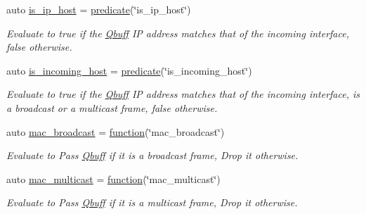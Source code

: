 \begin{DoxyCompactItemize}
auto \hyperlink{namespacepfq_1_1lang_1_1experimental_1_1anonymous__namespace_02experimental_8hpp_03_a323f07b8b6098198779c19fdf4c95837}{is\+\_\+ip\+\_\+host} = \hyperlink{namespacepfq_1_1lang_aca9adafc436b7f851621b979fa1aaf88}{predicate}(\char`\"{}is\+\_\+ip\+\_\+host\char`\"{})
\begin{DoxyCompactList}\small\item\em Evaluate to {\ttfamily true} if the \hyperlink{structpfq_1_1lang_1_1Qbuff}{Qbuff} IP address matches that of the incoming interface, {\ttfamily false} otherwise. \end{DoxyCompactList}\item 
auto \hyperlink{namespacepfq_1_1lang_1_1experimental_1_1anonymous__namespace_02experimental_8hpp_03_aa75d253ac688edcdbfc80160eba5678e}{is\+\_\+incoming\+\_\+host} = \hyperlink{namespacepfq_1_1lang_aca9adafc436b7f851621b979fa1aaf88}{predicate}(\char`\"{}is\+\_\+incoming\+\_\+host\char`\"{})
\begin{DoxyCompactList}\small\item\em Evaluate to {\ttfamily true} if the \hyperlink{structpfq_1_1lang_1_1Qbuff}{Qbuff} IP address matches that of the incoming interface, is a broadcast or a multicast frame, {\ttfamily false} otherwise. \end{DoxyCompactList}\item 
auto \hyperlink{namespacepfq_1_1lang_1_1experimental_1_1anonymous__namespace_02experimental_8hpp_03_aa889cbcf0c306d992508759fc5e677cd}{mac\+\_\+broadcast} = \hyperlink{namespacepfq_1_1lang_a1a4638059d700ae08d0ca63886ff2bb3}{function}(\char`\"{}mac\+\_\+broadcast\char`\"{})
\begin{DoxyCompactList}\small\item\em Evaluate to {\ttfamily Pass} \hyperlink{structpfq_1_1lang_1_1Qbuff}{Qbuff} if it is a broadcast frame, {\ttfamily Drop} it otherwise. \end{DoxyCompactList}\item 
auto \hyperlink{namespacepfq_1_1lang_1_1experimental_1_1anonymous__namespace_02experimental_8hpp_03_a0c39849f9e3e8677342842f88a8ee37c}{mac\+\_\+multicast} = \hyperlink{namespacepfq_1_1lang_a1a4638059d700ae08d0ca63886ff2bb3}{function}(\char`\"{}mac\+\_\+multicast\char`\"{})
\begin{DoxyCompactList}\small\item\em Evaluate to {\ttfamily Pass} \hyperlink{structpfq_1_1lang_1_1Qbuff}{Qbuff} if it is a multicast frame, {\ttfamily Drop} it otherwise. \end{DoxyCompactList}\item 

\end{DoxyCompactItemize}
